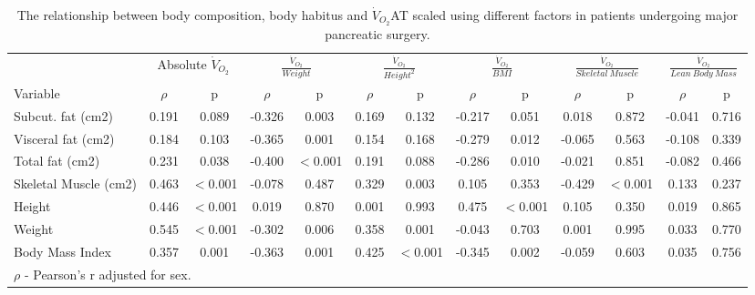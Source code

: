 \begin{sidewaystable}[p]
	\caption{The relationship between body composition, body habitus and $\dot{V}_{O_2}$AT scaled using different factors in patients undergoing major pancreatic surgery.}
	\label{table:bc_at_new_indices}
	\footnotesize
	\centering
	\renewcommand{\arraystretch}{1.5} %
	\begin{tabular}{|l|cc|cc|cc|cc|cc|cc|}
		\hline
		& \multicolumn{2}{c|}{Absolute $\dot{V}_{O_2}$} & \multicolumn{2}{c|}{$\frac{\dot{V}_{O_2}}{Weight}$} & \multicolumn{2}{c|}{$\frac{\dot{V}_{O_2}}{Height^2}$} & \multicolumn{2}{c|}{$\frac{\dot{V}_{O_2}}{BMI}$} & \multicolumn{2}{c|}{$\frac{\dot{V}_{O_2}}{Skeletal\ Muscle}$}  & \multicolumn{2}{c|}{$\frac{\dot{V}_{O_2}}{Lean\ Body\ Mass}$}\\
		
		Variable              & $\rho$ &    p     & $\rho$ &    p     & $\rho$ &    p     & $\rho$ &    p     & $\rho$ &    p    & $\rho$ &    p \\ \hline
		Subcut. fat (cm2)     & 0.191  &  0.089   & -0.326 &  0.003   & 0.169  &  0.132   & -0.217 &  0.051   & 0.018  &  0.872  & -0.041 & 0.716 \\
		Visceral fat (cm2)    & 0.184  &  0.103   & -0.365 &  0.001   & 0.154  &  0.168   & -0.279 &  0.012   & -0.065 &  0.563   & -0.108 & 0.339\\
		Total fat (cm2)       & 0.231  &  0.038   & -0.400 & $<$0.001 & 0.191  &  0.088   & -0.286 &  0.010   & -0.021 &  0.851   & -0.082 & 0.466\\
		Skeletal Muscle (cm2) & 0.463  & $<$0.001 & -0.078 &  0.487   & 0.329  &  0.003   & 0.105  &  0.353   & -0.429 & $<$0.001 & 0.133 & 0.237 \\
		Height                & 0.446  & $<$0.001 & 0.019  &  0.870   & 0.001  &  0.993   & 0.475  & $<$0.001 & 0.105  &  0.350   & 0.019 & 0.865\\
		Weight                & 0.545  & $<$0.001 & -0.302 &  0.006   & 0.358  &  0.001   & -0.043 &  0.703   & 0.001  &  0.995   & 0.033 & 0.770\\
		Body Mass Index       & 0.357  &  0.001   & -0.363 &  0.001   & 0.425  & $<$0.001 & -0.345 &  0.002   & -0.059 &  0.603   & 0.035 & 0.756\\ \hline
		\multicolumn{11}{l}{$\rho$ - Pearson's r adjusted for sex.}
	\end{tabular}
\end{sidewaystable}


